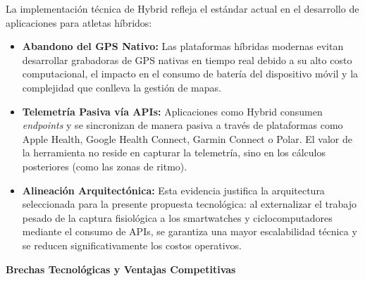 \documentclass[12pt]{article}
\begin{document}
La implementación técnica de Hybrid refleja el estándar actual en el desarrollo de aplicaciones para atletas híbridos:
\begin{itemize}
    \item \textbf{Abandono del GPS Nativo:} Las plataformas híbridas modernas evitan desarrollar grabadoras de GPS nativas en tiempo real debido a su alto costo computacional, el impacto en el consumo de batería del dispositivo móvil y la complejidad que conlleva la gestión de mapas.
    \item \textbf{Telemetría Pasiva vía APIs:} Aplicaciones como Hybrid consumen \textit{endpoints} y se sincronizan de manera pasiva a través de plataformas como Apple Health, Google Health Connect, Garmin Connect o Polar. El valor de la herramienta no reside en capturar la telemetría, sino en los cálculos posteriores (como las zonas de ritmo). 
    \item \textbf{Alineación Arquitectónica:} Esta evidencia justifica la arquitectura seleccionada para la presente propuesta tecnológica: al externalizar el trabajo pesado de la captura fisiológica a los smartwatches y ciclocomputadores mediante el consumo de APIs, se garantiza una mayor escalabilidad técnica y se reducen significativamente los costos operativos.
\end{itemize}

\textbf{Brechas Tecnológicas y Ventajas Competitivas}
\end{document}
